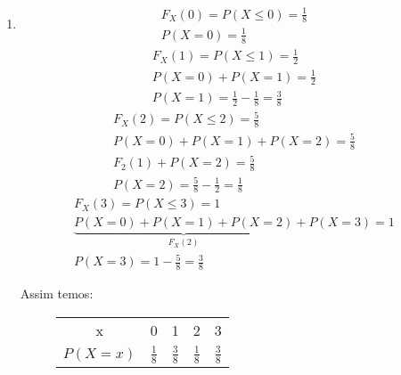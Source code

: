 \begin{description}
\begin{enumerate}[label= (\alph*)]
             \item
               \begin{align*}
                 F_{X}(0)= P(X \le 0)= \frac{1}{8}\\
                 P(X=0)= \frac{1}{8}
               \end{align*}
               \begin{align*}
                 F_{X}(1)= P(X \le 1)= \frac{1}{2}\\
                 P(X=0)+P(X=1)= \frac{1}{2} \\
                 P(X=1)= \frac{1}{2}- \frac{1}{8}= \frac{3}{8}
               \end{align*}
               \begin{align*}
                 F_{X}(2)= P(X \le 2)= \frac{5}{8}\\
                 P(X=0)+P(X=1)+P(X=2)= \frac{5}{8}\\
                 F_{2} (1) + P(X = 2 )=\frac{5}{8}\\
                 P(X=2)= \frac{5}{8}- \frac{1}{2}= \frac{1}{8}
               \end{align*}
               \begin{align*}
                 F_{X}(3)= P(X \le 3)= 1\\
                 \underbrace{P(X=0)+ P(X=1)+ P(X=2)}_{F_{X}(2)} + P(X=3)=1\\
                 P(X =3) = 1- \frac{5}{8}= \frac{3}{8}
               \end{align*}

  Assim temos:
               \begin{figure}[H]
                 \centering
           \begin{tabular}{c c c c c}
             \toprule
             x&0&1&2&3\\ \cmidrule{2-5}
             $P(X=x)$&$\frac{1}{8}$&$\frac{3}{8}$&$\frac{1}{8}$&$\frac{3}{8}$\\ \bottomrule
           \end{tabular}
           \label{tab:6}
         \end{figure}
           \end{enumerate}
         \end{description}
